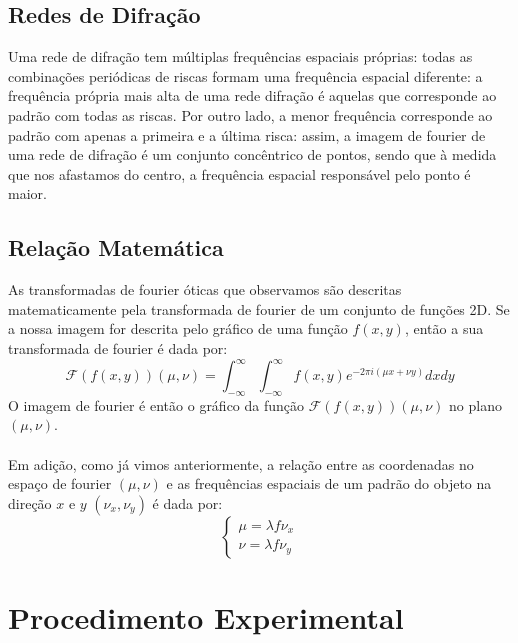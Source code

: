 \documentclass{article}
\begin{document}
\begin{multicols}{2}
\subsection{Redes de Difração}

Uma rede de difração tem múltiplas frequências espaciais próprias: todas as combinações periódicas de riscas formam uma frequência espacial diferente: a frequência própria mais alta de uma rede difração é aquelas que corresponde ao padrão com todas as riscas.
Por outro lado, a menor frequência corresponde ao padrão com apenas a primeira e a última risca: assim, a imagem de fourier de uma rede de difração é um conjunto concêntrico de pontos, sendo que à medida que nos afastamos do centro, a frequência espacial responsável pelo ponto é maior.

\subsection{Relação Matemática}

As transformadas de fourier óticas que observamos são descritas matematicamente pela transformada de fourier de um conjunto de funções 2D. 
Se a nossa imagem for descrita pelo gráfico de uma função $f(x,y)$, então a sua transformada de fourier é dada por:
\[ \mathcal{F}(f(x,y))(\mu, \nu) = \int_{-\infty}^{\infty} \int_{-\infty}^{\infty} f(x,y) e^{-2\pi i (\mu x + \nu y)} dx dy \]
O imagem de fourier é então o gráfico da função $\mathcal{F}(f(x,y))(\mu, \nu)$ no plano $(\mu, \nu)$.
\paragraph{}
Em adição, como já vimos anteriormente, a relação entre as coordenadas no espaço de fourier $(\mu, \nu)$ e as frequências espaciais de um padrão do objeto na direção $x$ e $y$ $(\nu_x, \nu_y)$ é dada por:
\[ \begin{cases}
  \mu = \lambda f \nu_x \\
  \nu = \lambda f \nu_y
\end{cases} \]

\section{Procedimento Experimental}

\end{multicols}
\end{document}
